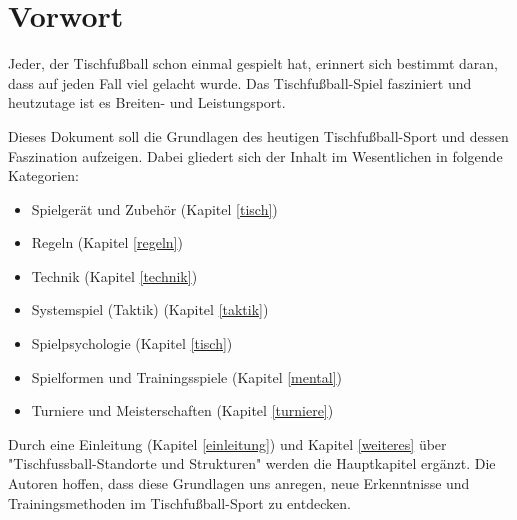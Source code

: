 \chapter*{Vorwort}

Jeder, der Tischfußball schon einmal gespielt hat, erinnert sich bestimmt daran, dass auf jeden Fall viel gelacht wurde.
Das Tischfußball-Spiel fasziniert und heutzutage ist es Breiten- und Leistungsport. 

Dieses Dokument soll die Grundlagen des heutigen Tischfußball-Sport und dessen Faszination aufzeigen. Dabei gliedert sich der Inhalt im Wesentlichen in folgende Kategorien:
\begin{itemize}
\item Spielgerät und Zubehör (Kapitel \ref{tisch})
\item Regeln (Kapitel \ref{regeln})
\item Technik (Kapitel \ref{technik})
\item Systemspiel (Taktik) (Kapitel \ref{taktik})
\item Spielpsychologie (Kapitel \ref{tisch})
\item Spielformen und Trainingsspiele (Kapitel \ref{mental})
\item Turniere und Meisterschaften (Kapitel \ref{turniere})
\end{itemize}
Durch eine Einleitung (Kapitel \ref{einleitung}) und Kapitel \ref{weiteres} über "Tischfussball-Standorte und Strukturen" werden die Hauptkapitel ergänzt. 
Die Autoren hoffen, dass diese Grundlagen uns anregen, neue Erkenntnisse und Trainingsmethoden im Tischfußball-Sport zu entdecken.
